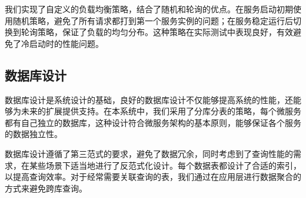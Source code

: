 \documentclass[a4paper,12pt]{article}
\begin{document}
我们实现了自定义的负载均衡策略，结合了随机和轮询的优点。在服务启动初期使用随机策略，避免了所有请求都打到第一个服务实例的问题；在服务稳定运行后切换到轮询策略，保证了负载的均匀分布。这种策略在实际测试中表现良好，有效避免了冷启动时的性能问题。

\subsection{数据库设计}

数据库设计是系统设计的基础，良好的数据库设计不仅能够提高系统的性能，还能够为未来的扩展提供支持。在本系统中，我们采用了分库分表的策略，每个微服务都有自己独立的数据库，这种设计符合微服务架构的基本原则，能够保证各个服务的数据独立性。

数据库设计遵循了第三范式的要求，避免了数据冗余，同时考虑到了查询性能的需求，在某些场景下适当地进行了反范式化设计。每个数据表都设计了合适的索引，以提高查询效率。对于经常需要关联查询的表，我们通过在应用层进行数据聚合的方式来避免跨库查询。
\end{document}
